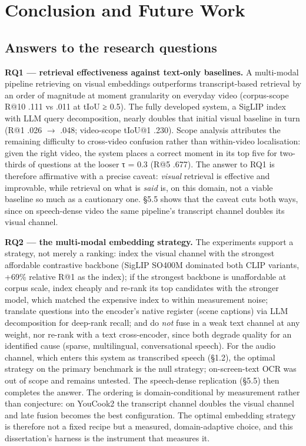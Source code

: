 \chapter{Conclusion and Future Work}

\section{Answers to the research
questions}

\textbf{RQ1 --- retrieval effectiveness against text-only baselines.} A
multi-modal pipeline retrieving on visual embeddings outperforms
transcript-based retrieval by an order of magnitude at moment
granularity on everyday video (corpus-scope R@10 .111 vs .011 at tIoU ≥
0.5). The fully developed system, a SigLIP index with LLM query
decomposition, nearly doubles that initial visual baseline in turn (R@1
.026 \ensuremath{\rightarrow} .048; video-scope tIoU@1 .230). Scope
analysis attributes the remaining difficulty to cross-video confusion
rather than within-video localisation: given the right video, the system
places a correct moment in its top five for two-thirds of questions at
the looser τ = 0.3 (R@5 .677). The answer to RQ1 is therefore
affirmative with a precise caveat: \emph{visual} retrieval is effective
and improvable, while retrieval on what is \emph{said} is, on this
domain, not a viable baseline so much as a cautionary one. §5.5 shows
that the caveat cuts both ways, since on speech-dense video the same
pipeline's transcript channel doubles its visual channel.

\textbf{RQ2 --- the multi-modal embedding strategy.} The experiments
support a strategy, not merely a ranking: index the visual channel with
the strongest affordable contrastive backbone (SigLIP SO400M dominated
both CLIP variants, +69\% relative R@1 as the index); if the strongest
backbone is unaffordable at corpus scale, index cheaply and re-rank its
top candidates with the stronger model, which matched the expensive
index to within measurement noise; translate questions into the
encoder's native register (scene captions) via LLM decomposition for
deep-rank recall; and do \emph{not} fuse in a weak text channel at any
weight, nor re-rank with a text cross-encoder, since both degrade
quality for an identified cause (sparse, multilingual, conversational
speech). For the audio channel, which enters this system as transcribed
speech (§1.2), the optimal strategy on the primary benchmark is the null
strategy; on-screen-text OCR was out of scope and remains untested. The
speech-dense replication (§5.5) then completes the answer. The ordering
is domain-conditional by measurement rather than conjecture: on YouCook2
the transcript channel doubles the visual channel and late fusion
becomes the best configuration. The optimal embedding strategy is
therefore not a fixed recipe but a measured, domain-adaptive choice, and
this dissertation's harness is the instrument that measures it.

